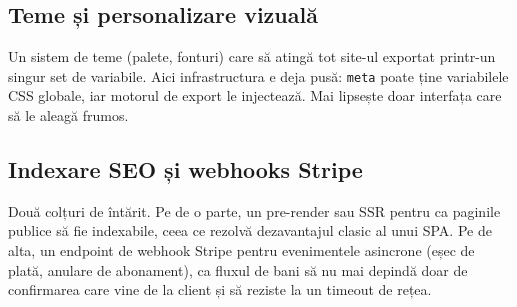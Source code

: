 \documentclass[12pt,a4paper]{report}
\begin{document}
\subsection{Teme și personalizare vizuală}
Un sistem de teme (palete, fonturi) care să atingă tot site-ul exportat printr-un
singur set de variabile. Aici infrastructura e deja pusă: \texttt{meta} poate ține
variabilele CSS globale, iar motorul de export le injectează. Mai lipsește doar
interfața care să le aleagă frumos.

\subsection{Indexare SEO și webhooks Stripe}
Două colțuri de întărit. Pe de o parte, un pre-render sau SSR pentru ca paginile
publice să fie indexabile, ceea ce rezolvă dezavantajul clasic al unui SPA. Pe de alta, un endpoint
de webhook Stripe pentru evenimentele asincrone (eșec de plată, anulare de abonament),
ca fluxul de bani să nu mai depindă doar de confirmarea care vine de la client și să
reziste la un timeout de rețea.
\end{document}
